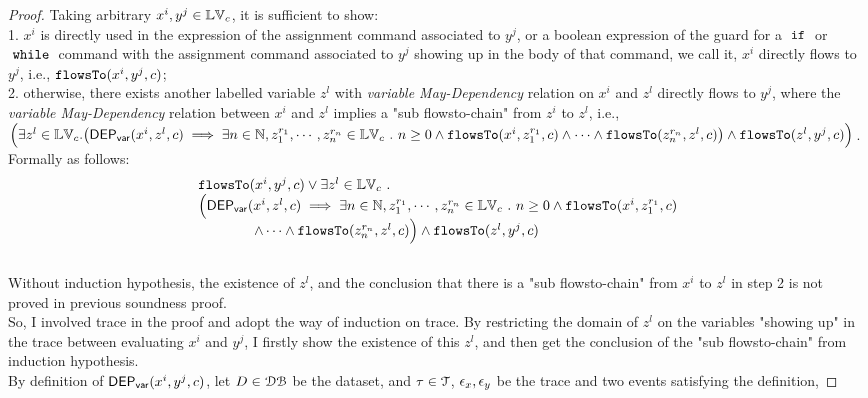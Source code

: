 \begin{proof}
  Taking arbitrary $x^i, y^j \in \mathbb{LV}_c$,
  it is sufficient to show:
  \\
  1. $x^i$ is directly used in the expression of the assignment command associated to $y^j$, or a boolean
  expression of the guard for a $\;\mathtt{if}\;$ or $\;\mathtt{while}\;$ command with the assignment command associated to $y^j$ showing up in the body of that command, 
  we call it, $x^i$ directly flows to $y^j$,
  i.e.,
  $ \mathtt{flowsTo}(x^i, y^j, {c})$;
  \\
  2. otherwise, there exists another labelled variable $z^l$ with \emph{variable May-Dependency} relation on $x^i$ and 
  $z^l$ directly flows to $y^j$, where the \emph{variable May-Dependency} relation between $x^i$ and $z^l$
   implies a "sub flowsto-chain" from $z^i$ to $z^l$, 
  i.e., 
  \\
  $\Big(
    \exists z^l \in \lvar_{{c}}.
  \left(\vardep(x^i, z^l, {c})   
  \implies
   \exists n \in \mathbb{N}, z_1^{r_1}, \cdots, z_n^{r_n} \in \lvar_{{c}} \st n \geq 0 \land
  \flowsto(x^i,  z_1^{r_1}, c) 
  \land \cdots \land \flowsto(z_n^{r_n}, z^l, c)
  \right)
  \land  \flowsto(z^l, y^j, {c})
  \Big)$.
%
\\ Formally as follows:
\[
  \begin{array}{l}
    \mathtt{flowsTo}(x^i, y^j, {c})
    \lor 
      \exists z^l \in \mathbb{LV}_{{c}} ~.~
    \\
    \Big(
    \mathsf{DEP_{var}}(x^i, z^l, {c})   
  \implies
     \exists n \in \mathbb{N}, z_1^{r_1}, \cdots, z_n^{r_n} \in \mathbb{LV}_{{c}} ~.~ n \geq 0 \land
    \mathtt{flowsTo}(x^i,  z_1^{r_1}, c) 
    \\ \qquad \qquad 
    \land \cdots  \land \mathtt{flowsTo}(z_n^{r_n}, z^l, c) 
    \Big)
    \land  \mathtt{flowsTo}(z^l, y^j, {c})
  \end{array}
  \]
\\
%
Without induction hypothesis, the existence of $z^l$, and the conclusion that there is a "sub flowsto-chain" from $x^i$ to $z^l$ in step 2 
is not proved in previous soundness proof.
\\
%
So, I involved trace in the proof and adopt the way of induction on trace.
By restricting the domain of $z^l$ on the variables "showing up" in the 
trace between evaluating $x^i$ and $y^j$, 
I firstly show the existence of this $z^l$, and then get the conclusion of the  "sub flowsto-chain" from induction hypothesis. 
\\
%
By definition of $\mathsf{DEP_{var}}(x^i, y^j, {c})$, 
let $D \in \mathcal{DB}$ be the dataset,
and $\mathtt{\tau} \in \mathcal{T}$, $\mathtt{\epsilon}_x, \mathtt{\epsilon}_y$ be the trace and two events satisfying the definition, 

\end{proof}
